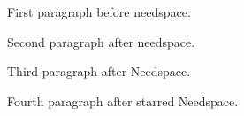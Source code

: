 \documentclass{article}
\begin{document}
\noindent First paragraph before needspace.

\noindent Second paragraph after needspace.

\Needspace{5cm}
\noindent Third paragraph after Needspace.

\Needspace*{3in}
\noindent Fourth paragraph after starred Needspace.
\end{document}
